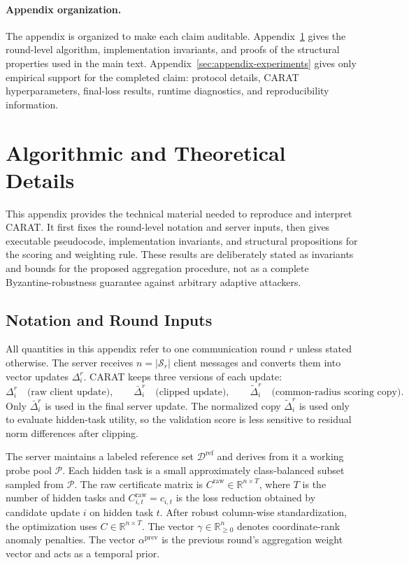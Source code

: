 \documentclass{article}
\begin{document}
\newpage
\appendix

\paragraph{Appendix organization.}
The appendix is organized to make each claim auditable. Appendix~\ref{sec:appendix-algorithm-theory} gives the round-level algorithm, implementation invariants, and proofs of the structural properties used in the main text. Appendix~\ref{sec:appendix-experiments} gives only empirical support for the completed claim: protocol details, CARAT hyperparameters, final-loss results, runtime diagnostics, and reproducibility information.

\section{Algorithmic and Theoretical Details}
\label{sec:appendix-algorithm-theory}

This appendix provides the technical material needed to reproduce and interpret CARAT. It first fixes the round-level notation and server inputs, then gives executable pseudocode, implementation invariants, and structural propositions for the scoring and weighting rule. These results are deliberately stated as invariants and bounds for the proposed aggregation procedure, not as a complete Byzantine-robustness guarantee against arbitrary adaptive attackers.

\subsection{Notation and Round Inputs}
\label{sec:appendix-notation}

All quantities in this appendix refer to one communication round $r$ unless stated otherwise. The server receives $n=|\mathcal{S}_r|$ client messages and converts them into vector updates $\Delta_i^r$. CARAT keeps three versions of each update:
\[
\Delta_i^r
\quad\text{(raw client update)},\qquad
\bar{\Delta}_i^r
\quad\text{(clipped update)},\qquad
\tilde{\Delta}_i^r
\quad\text{(common-radius scoring copy)}.
\]
Only $\bar{\Delta}_i^r$ is used in the final server update. The normalized copy $\tilde{\Delta}_i^r$ is used only to evaluate hidden-task utility, so the validation score is less sensitive to residual norm differences after clipping.

The server maintains a labeled reference set $\mathcal{D}^{\mathrm{ref}}$ and derives from it a working probe pool $\mathcal{P}$. Each hidden task is a small approximately class-balanced subset sampled from $\mathcal{P}$. The raw certificate matrix is $C^{\mathrm{raw}}\in\mathbb{R}^{n\times T}$, where $T$ is the number of hidden tasks and $C^{\mathrm{raw}}_{i,t}=c_{i,t}$ is the loss reduction obtained by candidate update $i$ on hidden task $t$. After robust column-wise standardization, the optimization uses $C\in\mathbb{R}^{n\times T}$. The vector $\gamma\in\mathbb{R}^n_{\ge 0}$ denotes coordinate-rank anomaly penalties. The vector $\alpha^{\mathrm{prev}}$ is the previous round's aggregation weight vector and acts as a temporal prior.
\end{document}
